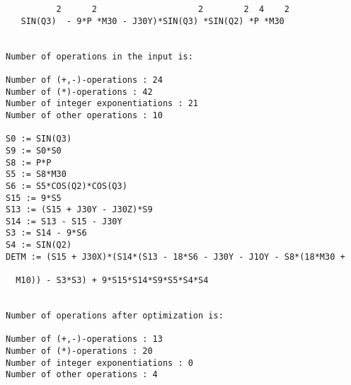 {\begin{verbatim}
          2      2                    2        2  4    2
   SIN(Q3)  - 9*P *M30 - J30Y)*SIN(Q3) *SIN(Q2) *P *M30


Number of operations in the input is:

Number of (+,-)-operations : 24
Number of (*)-operations : 42
Number of integer exponentiations : 21
Number of other operations : 10

S0 := SIN(Q3)
S9 := S0*S0
S8 := P*P
S5 := S8*M30
S6 := S5*COS(Q2)*COS(Q3)
S15 := 9*S5
S13 := (S15 + J30Y - J30Z)*S9
S14 := S13 - S15 - J30Y
S3 := S14 - 9*S6
S4 := SIN(Q2)
DETM := (S15 + J30X)*(S14*(S13 - 18*S6 - J30Y - J1OY - S8*(18*M30 +

  M10)) - S3*S3) + 9*S15*S14*S9*S5*S4*S4


Number of operations after optimization is:

Number of (+,-)-operations : 13
Number of (*)-operations : 20
Number of integer exponentiations : 0
Number of other operations : 4
\end{verbatim}}

